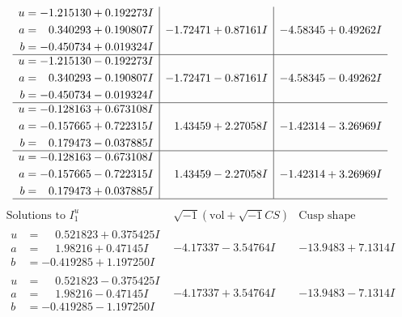 \documentclass[1p]{elsarticle_modified}
\theoremstyle{definition}
\newcommand{\I}{\sqrt{-1}}
\begin{document}
$$\begin{array}{c|c|c}
\begin{aligned}
u &= -1.215130 + 0.192273 I \\
a &= \phantom{-}0.340293 + 0.190807 I \\
b &= -0.450734 + 0.019324 I\end{aligned}
 & -1.72471 + 0.87161 I & -4.58345 + 0.49262 I \\ \hline\begin{aligned}
u &= -1.215130 - 0.192273 I \\
a &= \phantom{-}0.340293 - 0.190807 I \\
b &= -0.450734 - 0.019324 I\end{aligned}
 & -1.72471 - 0.87161 I & -4.58345 - 0.49262 I \\ \hline\begin{aligned}
u &= -0.128163 + 0.673108 I \\
a &= -0.157665 + 0.722315 I \\
b &= \phantom{-}0.179473 - 0.037885 I\end{aligned}
 & \phantom{-}1.43459 + 2.27058 I & -1.42314 - 3.26969 I \\ \hline\begin{aligned}
u &= -0.128163 - 0.673108 I \\
a &= -0.157665 - 0.722315 I \\
b &= \phantom{-}0.179473 + 0.037885 I\end{aligned}
 & \phantom{-}1.43459 - 2.27058 I & -1.42314 + 3.26969 I\\
 \hline 
 \end{array}$$\newpage$$\begin{array}{c|c|c}  
\text{Solutions to }I^u_{1}& \I (\text{vol} + \sqrt{-1}CS) & \text{Cusp shape}\\
 \hline 
\begin{aligned}
u &= \phantom{-}0.521823 + 0.375425 I \\
a &= \phantom{-}1.98216 + 0.47145 I \\
b &= -0.419285 + 1.197250 I\end{aligned}
 & -4.17337 - 3.54764 I & -13.9483 + 7.1314 I \\ \hline\begin{aligned}
u &= \phantom{-}0.521823 - 0.375425 I \\
a &= \phantom{-}1.98216 - 0.47145 I \\
b &= -0.419285 - 1.197250 I\end{aligned}
 & -4.17337 + 3.54764 I & -13.9483 - 7.1314 I \\ \hline\begin{aligned}

\end{aligned}
\end{array}$$
\end{document}
